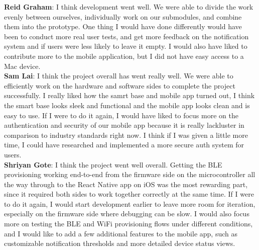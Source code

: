 \noindent\textbf{Reid Graham}:
I think development went well. We were able to divide the work evenly between ourselves, individually work on our submodules, and combine them into the prototype. One thing I would have done differently would have been to conduct more real user tests, and get more feedback on the notification system and if users were less likely to leave it empty. I would also have liked to contribute more to the mobile application, but I did not have easy access to a Mac device.\\

\noindent\textbf{Sam Lai}:
I think the project overall has went really well. We were able to efficiently work on the hardware and software sides to complete the project successfully. I really liked how the samrt base and mobile app turned out, I think the smart base looks sleek and functional and the mobile app looks clean and is easy to use. If I were to do it again, I would have liked to focus more on the authentication and security of our mobile app because it is really lackluster in comparison to industry standards right now. I think if I was given a little more time, I could have researched and implemented a more secure auth system for users.\\

\noindent\textbf{Shriyan Gote}:
I think the project went well overall. Getting the BLE provisioning working end-to-end  from the firmware side on the microcontroller all the way through to the React Native app on iOS was the most rewarding part, since it required both sides to work together correctly at the same time. If I were to do it again, I would start development earlier to leave more room for iteration, especially on the firmware side where debugging can be slow. I would also focus more on testing the BLE and WiFi provisioning flows under different conditions, and I would like to add a few additional features to the mobile app, such as customizable notification thresholds and more detailed device status views.\\